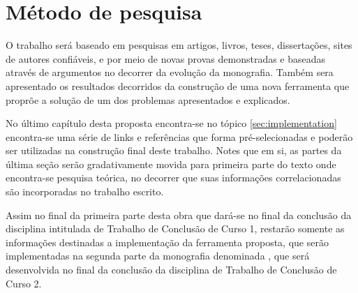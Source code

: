 \section{Método de pesquisa}

    O trabalho será baseado em pesquisas em artigos, livros, teses, dissertações, sites de autores
    confiáveis, e por meio de novas provas demonstradas e baseadas através de argumentos no decorrer
    da evolução da monografia. Também sera apresentado os resultados decorridos da construção de uma
    nova ferramenta que proprõe a solução de um dos problemas apresentados e explicados.

    No último capítulo desta proposta encontra-se no tópico \autoref{sec:implementation} encontra-se
    uma série de links e referências que forma pré-selecionadas e poderão ser utilizadas na
    construção final deste trabalho. Notes que em si, as partes da última seção serão gradativamente
    movida para primeira parte do texto onde encontra-se pesquisa teórica, no decorrer que suas
    informações correlacionadas são incorporadas no trabalho escrito.

    Assim no final da primeira parte desta obra que dará-se no final da conclusão da disciplina
    intitulada de Trabalho de Conclusão de Curso 1, restarão somente as informações destinadas a
    implementação da ferramenta proposta, que serão implementadas na segunda parte da monografia
    denominada , que será desenvolvida no final da conclusão da
    disciplina de Trabalho de Conclusão de Curso 2.

